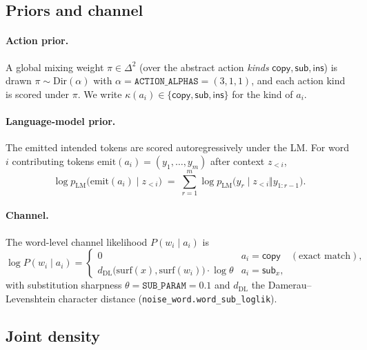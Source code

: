 \documentclass[11pt]{article}
\newcommand{\copyact}{\textsf{copy}}
\newcommand{\subact}{\textsf{sub}}
\newcommand{\inssact}{\textsf{ins}}
\newcommand{\given}{\mid}
\newcommand{\pLM}{p_{\mathrm{LM}}}
\newcommand{\dDL}{d_{\mathrm{DL}}}
\newcommand{\Dir}{\mathrm{Dir}}
\newcommand{\code}[1]{\texttt{#1}}
\begin{document}
\subsection{Priors and channel}

\paragraph{Action prior.} A global mixing weight $\pi \in \Delta^{2}$ (over the abstract action
\emph{kinds} $\copyact,\subact,\inssact$) is drawn $\pi \sim \Dir(\alpha)$ with
$\alpha = \code{ACTION\_ALPHAS} = (3,1,1)$, and each action kind is scored under $\pi$. We write
$\kappa(a_i) \in \{\copyact,\subact,\inssact\}$ for the kind of $a_i$.

\paragraph{Language-model prior.} The emitted intended tokens are scored autoregressively under the
LM. For word $i$ contributing tokens $\mathrm{emit}(a_i) = (y_1,\dots,y_m)$ after context $z_{<i}$,
\begin{equation}\label{eq:lm-word}
  \log \pLM\!\big(\mathrm{emit}(a_i) \given z_{<i}\big)
  \;=\; \sum_{r=1}^{m} \log \pLM\!\big(y_r \given z_{<i} \Vert y_{1:r-1}\big).
\end{equation}

\paragraph{Channel.} The word-level channel likelihood $P(w_i \given a_i)$ is
\begin{equation}\label{eq:channel}
  \log P(w_i \given a_i) =
  \begin{cases}
    0 & a_i = \copyact \quad(\text{exact match}),\\[2pt]
    \dDL\!\big(\mathrm{surf}(x), \mathrm{surf}(w_i)\big)\cdot \log \theta & a_i = \subact_x,
  \end{cases}
\end{equation}
with substitution sharpness $\theta = \code{SUB\_PARAM} = 0.1$ and $\dDL$ the
Damerau--Levenshtein character distance (\code{noise\_word.word\_sub\_loglik}).

\subsection{Joint density}
\end{document}
